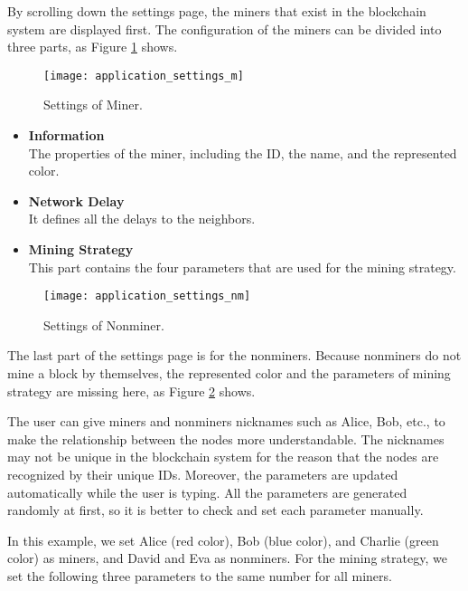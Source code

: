 By scrolling down the settings page, the miners that exist in the blockchain system are displayed first. The configuration of the miners can be divided into three parts, as Figure \ref{fig:settings of miner} shows.

\clearpage

\begin{figure}[htb]
    \centering
    \texttt{[image: application\_settings\_m]}
    \caption{Settings of Miner.}
    \label{fig:settings of miner}
\end{figure}

\begin{itemize}
    \item \textbf{Information} \\
        The properties of the miner, including the ID, the name, and the represented color.
    \item \textbf{Network Delay} \\
        It defines all the delays to the neighbors.
    \item \textbf{Mining Strategy} \\
        This part contains the four parameters that are used for the mining strategy.
\end{itemize}

\begin{figure}[htb]
    \centering
    \texttt{[image: application\_settings\_nm]}
    \caption{Settings of Nonminer.}
    \label{fig:settings of nonminer}
\end{figure}

The last part of the settings page is for the nonminers. Because nonminers do not mine a block by themselves, the represented color and the parameters of mining strategy are missing here, as Figure \ref{fig:settings of nonminer} shows.

The user can give miners and nonminers nicknames such as Alice, Bob, etc., to make the relationship between the nodes more understandable. The nicknames may not be unique in the blockchain system for the reason that the nodes are recognized by their unique IDs. Moreover, the parameters are updated automatically while the user is typing. All the parameters are generated randomly at first, so it is better to check and set each parameter manually.

In this example, we set Alice (red color), Bob (blue color), and Charlie (green color) as miners, and David and Eva as nonminers. For the mining strategy, we set the following three parameters to the same number for all miners.

